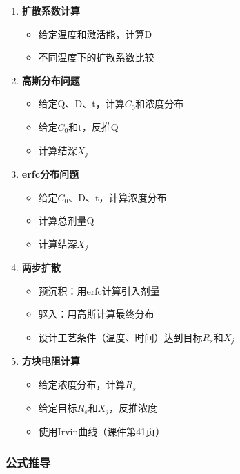 \documentclass[UTF8,12pt,a4paper]{ctexart}
\begin{document}
\begin{enumerate}
    \item \textbf{扩散系数计算}
    \begin{itemize}
        \item 给定温度和激活能，计算D
        \item 不同温度下的扩散系数比较
    \end{itemize}
    
    \item \textbf{高斯分布问题}
    \begin{itemize}
        \item 给定Q、D、t，计算$C_0$和浓度分布
        \item 给定$C_0$和t，反推Q
        \item 计算结深$X_j$
    \end{itemize}
    
    \item \textbf{erfc分布问题}
    \begin{itemize}
        \item 给定$C_0$、D、t，计算浓度分布
        \item 计算总剂量Q
        \item 计算结深$X_j$
    \end{itemize}
    
    \item \textbf{两步扩散}
    \begin{itemize}
        \item 预沉积：用erfc计算引入剂量
        \item 驱入：用高斯计算最终分布
        \item 设计工艺条件（温度、时间）达到目标$R_s$和$X_j$
    \end{itemize}
    
    \item \textbf{方块电阻计算}
    \begin{itemize}
        \item 给定浓度分布，计算$R_s$
        \item 给定目标$R_s$和$X_j$，反推浓度
        \item 使用Irvin曲线（课件第41页）
    \end{itemize}
\end{enumerate}

\subsubsection{公式推导}
\end{document}
